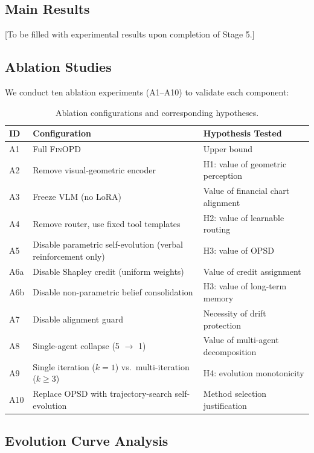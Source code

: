 \subsection{Main Results}

[To be filled with experimental results upon completion of Stage 5.]

\subsection{Ablation Studies}

We conduct ten ablation experiments (A1--A10) to validate each component:

\begin{table}[h]
\centering
\small
\begin{tabular}{llp{6cm}}
\toprule
ID & Configuration & Hypothesis Tested \\
\midrule
A1 & Full \textsc{FinOPD} & Upper bound \\
A2 & Remove visual-geometric encoder & H1: value of geometric perception \\
A3 & Freeze VLM (no LoRA) & Value of financial chart alignment \\
A4 & Remove router, use fixed tool templates & H2: value of learnable routing \\
A5 & Disable parametric self-evolution (verbal reinforcement only) & H3: value of OPSD \\
A6a & Disable Shapley credit (uniform weights) & Value of credit assignment \\
A6b & Disable non-parametric belief consolidation & H3: value of long-term memory \\
A7 & Disable alignment guard & Necessity of drift protection \\
A8 & Single-agent collapse (5 $\to$ 1) & Value of multi-agent decomposition \\
A9 & Single iteration ($k{=}1$) vs.\ multi-iteration ($k{\geq}3$) & H4: evolution monotonicity \\
A10 & Replace OPSD with trajectory-search self-evolution & Method selection justification \\
\bottomrule
\end{tabular}
\caption{Ablation configurations and corresponding hypotheses.}
\label{tab:ablations}
\end{table}

\subsection{Evolution Curve Analysis}

